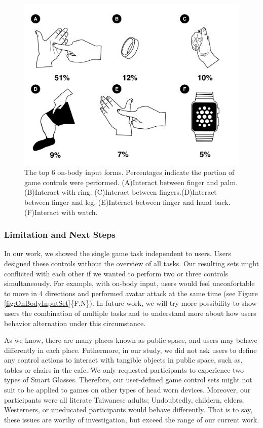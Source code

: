 \documentclass{sigchi}
\begin{document}
 \begin{figure}[!h]
  \centering
  \includegraphics[width=1\columnwidth]{OnBodyForms.pdf}
  \caption{The top 6 on-body input forms. Percentages indicate the portion of game controls were performed. (A)Interact between finger and palm. (B)Interact with ring. (C)Interact between fingers.(D)Interact between finger and leg. (E)Interact between finger and hand back. (F)Interact with watch.}
  \label{fig:figureOnBodyPorpotion}
  \end{figure}   

  \subsubsection{Limitation and Next Steps}

  In our work, we showed the single game task independent to users. Users designed these controls without the overview of all tasks. Our resulting sets might conflicted with each other if we wanted to perform two or three controls simultaneously. For example, with on-body input, users would feel unconfortable to move in 4 directions and performed avatar attack at the same time (see Figure \ref{fig:OnBodyInputSet}\{F,N\}). In future work, we will try more possibility to show users the combination of multiple tasks and to understand more about how users behavior alternation under this circumstance.

  As we know, there are many places known as public space, and users may behave differently in each place. Futhermore, in our study, we did not ask users to define any control actions to interact with tangible objects in public space, such as, tables or chairs in the cafe. We only requested participants to experience two types of Smart Glasses. Therefore, our user-defined game control sets might not suit to be applied to games on other types of head worn devices. Moreover, our participants were all literate Taiwanese adults; Undoubtedly, childern, elders, Westerners, or uneducated participants would behave differently. That is to say, these issues are worthy of investigation, but exceed the range of our current work.
\end{document}
